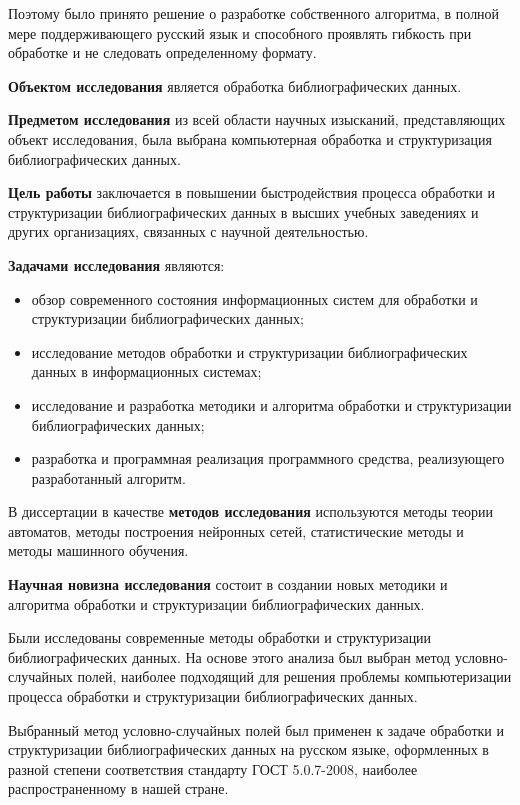 Поэтому было принято решение о разработке собственного алгоритма, в полной мере поддерживающего русский язык и способного проявлять гибкость при обработке и не следовать определенному формату.

\textbf{Объектом исследования} является обработка библиографических данных.

\textbf{Предметом исследования} из всей области научных изысканий, представляющих объект исследования, была выбрана компьютерная обработка и структуризация библиографических данных.

\textbf{Цель работы} заключается в повышении быстродействия процесса обработки и структуризации библиографических данных в высших учебных заведениях и других организациях, связанных с научной деятельностью.

\textbf{Задачами исследования} являются:
\begin{itemize}
	\item обзор современного состояния информационных систем для обработки и структуризации библиографических данных;
	\item исследование методов обработки и структуризации библиографических данных в информационных системах;
	\item исследование и разработка методики и алгоритма обработки и структуризации библиографических данных;
	\item разработка и программная реализация программного средства, реализующего разработанный алгоритм.
\end{itemize}

В диссертации в качестве \textbf{методов исследования} используются методы теории автоматов, методы построения нейронных сетей, статистические методы и методы машинного обучения.

\textbf{Научная новизна исследования} состоит в создании новых методики и алгоритма обработки и структуризации библиографических данных.

Были исследованы современные методы обработки и структуризации библиографических данных. На основе этого анализа был выбран метод условно-случайных полей, наиболее подходящий для решения проблемы компьютеризации процесса обработки и структуризации библиографических данных.

Выбранный метод условно-случайных полей был применен к задаче обработки и структуризации библиографических данных на русском языке, оформленных в разной степени соответствия стандарту ГОСТ 5.0.7-2008, наиболее распространенному в нашей стране.

